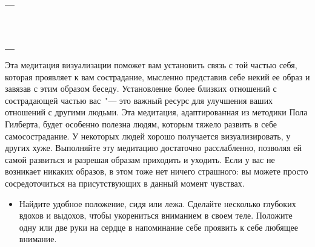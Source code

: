 \setlength{\extrarowheight}{2mm}
\begin{tabularx}{\textwidth}{X}
	\\
	\arrayrulecolor{gray}\hline\\
	\hline\\
	\hline\\
	\hline\\
	\hline\\
	\hline\\	
	\hline\\
	\hline\\
	\hline\\
	\hline\\
	\hline\\
	\hline\\
	\hline\\
\end{tabularx}
\setlength{\extrarowheight}{0mm}


 \label{M:Compassionate_Friend}

Эта медитация визуализации поможет вам установить связь с той частью себя, которая проявляет к вам сострадание, мысленно представив себе некий ее образ и завязав с этим образом беседу. Установление более близких отношений с сострадающей частью вас~"--- это важный ресурс для улучшения ваших отношений с другими людьми. Эта медитация, адаптированная из методики Пола Гилберта, будет особенно полезна людям, которым тяжело развить в себе самосострадание. У некоторых людей хорошо получается визуализировать, у других хуже. Выполняйте эту медитацию достаточно расслабленно, позволяя ей самой развиться и разрешая образам приходить и уходить. Если у вас не возникает никаких образов, в этом тоже нет ничего страшного: вы можете просто сосредоточиться на присутствующих в данный момент чувствах.
\begin{itemize}
	\item Найдите удобное положение, сидя или лежа. Сделайте несколько глубоких вдохов и выдохов, чтобы укорениться вниманием в своем теле. Положите одну или две руки на сердце в напоминание себе проявить к себе любящее внимание.
\end{itemize}

